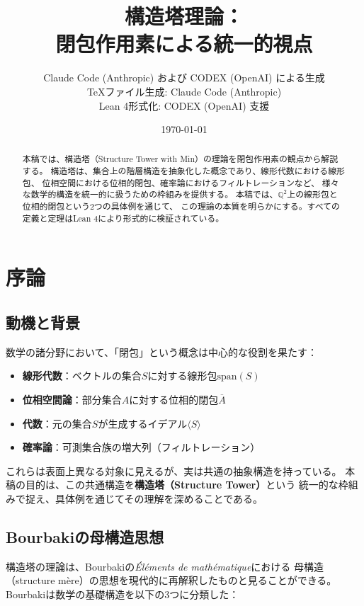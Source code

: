 \documentclass[a4paper,12pt]{ltjsarticle}
\title{構造塔理論：\\閉包作用素による統一的視点}
\author{Claude Code (Anthropic) および CODEX (OpenAI) による生成\\
\small TeXファイル生成: Claude Code (Anthropic)\\
\small Lean 4形式化: CODEX (OpenAI) 支援}
\date{\today}
\theoremstyle{definition}
\begin{document}
\maketitle

\begin{abstract}
本稿では、構造塔（Structure Tower with Min）の理論を閉包作用素の観点から解説する。
構造塔は、集合上の階層構造を抽象化した概念であり、線形代数における線形包、
位相空間における位相的閉包、確率論におけるフィルトレーションなど、
様々な数学的構造を統一的に扱うための枠組みを提供する。
本稿では、$\mathbb{Q}^2$上の線形包と位相的閉包という2つの具体例を通じて、
この理論の本質を明らかにする。すべての定義と定理はLean 4により形式的に検証されている。
\end{abstract}

\tableofcontents

\section{序論}

\subsection{動機と背景}

数学の諸分野において、「閉包」という概念は中心的な役割を果たす：

\begin{itemize}
\item \textbf{線形代数}：ベクトルの集合$S$に対する線形包$\mathrm{span}(S)$
\item \textbf{位相空間論}：部分集合$A$に対する位相的閉包$\overline{A}$
\item \textbf{代数}：元の集合$S$が生成するイデアル$\langle S \rangle$
\item \textbf{確率論}：可測集合族の増大列（フィルトレーション）
\end{itemize}

これらは表面上異なる対象に見えるが、実は共通の抽象構造を持っている。
本稿の目的は、この共通構造を\textbf{構造塔（Structure Tower）}という
統一的な枠組みで捉え、具体例を通じてその理解を深めることである。

\subsection{Bourbakiの母構造思想}

構造塔の理論は、Bourbakiの\textit{\'El\'ements de math\'ematique}における
母構造（structure m\`ere）の思想を現代的に再解釈したものと見ることができる。
Bourbakiは数学の基礎構造を以下の3つに分類した：
\end{document}
